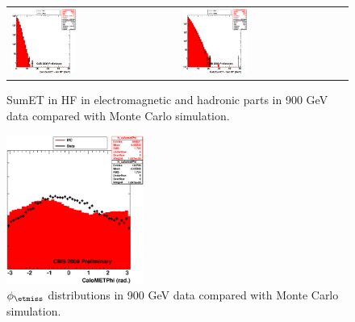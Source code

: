 \begin{figure}[h!]
 \centering
 \begin{tabular}{ll}
  \includegraphics[width=0.40\textwidth]{plots_DataVsMC_MB_900GeV/h_caloSumetEmHF.eps} &
  \includegraphics[width=0.40\textwidth]{plots_DataVsMC_MB_900GeV/h_caloSumetHadHF.eps} \\
 \end{tabular}
 \caption{SumET in HF in electromagnetic and hadronic parts in 900 GeV data compared
   with Monte Carlo simulation.
          \label{fig:DataVsMC_MB_900_6}}
\end{figure}

\begin{figure}[h!]
 \centering
  \includegraphics[width=0.40\textwidth]{plots_DataVsMC_MB_900GeV/h_calometPhi.eps}
 \caption{$\phi_{\etmiss}$ distributions in 900 GeV data compared
   with Monte Carlo simulation.
          \label{fig:DataVsMC_MB_900_7}}
\end{figure}

